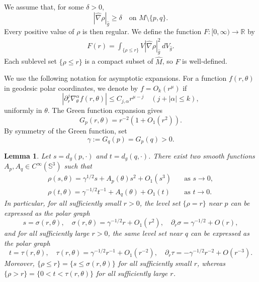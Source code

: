 \documentclass[11pt]{amsart}
\theoremstyle{plain}
\newtheorem{lemma}[theorem]{Lemma}
\numberwithin{equation}{section}
\newcommand{\R}{\mathbb{R}}
\renewcommand{\S}{\mathbb{S}}
\newcommand{\hn}{\widehat{\nabla}}
\newcommand{\hg}{\widehat{g}}
\newcommand{\hm}{\widehat{M}}
\newcommand{\dv}{\,dV_{\widehat{g}}}
\newcommand{\sls}{\{\rho\le r\}}
\newcommand{\ls}{\{\rho=r\}}
\begin{document}
We assume that, for some $\delta>0$, 
\begin{equation}\label{eq:assumption sec1}
|\hn\rho|_{\hg}\ge\delta\quad\text{on $M\setminus\{p,q\}$.}
\end{equation}
Every positive value of $\rho$ is then regular. We define the function $F:[0,\infty)\rightarrow\R$ by
\begin{align}
F(r)=\int_{\sls}V|\hn\rho|_{\hg}^2\dv.
\end{align}
Each sublevel set $\{\rho\le r\}$ is a compact subset of $\hm$, so $F$ is well-defined.

We use the following notation for asymptotic expansions. For a function $f(r,\theta)$ in geodesic polar coordinates, we denote by $f=O_k(r^\mu)$ if
\begin{equation*}
|\partial_r^j\nabla_\theta^\alpha f(r,\theta)|\le C_{j,\alpha} r^{\mu-j}\quad (j+|\alpha|\le k),
\end{equation*}
uniformly in $\theta$. The Green function expansion \cite{LeeParker1987} gives
\begin{equation}\label{eq:asymptotic of G}
G_p(r,\theta)=r^{-2}(1+O_1(r^2)).
\end{equation}
By symmetry of the Green function, set
\begin{equation*}
\gamma:=G_q(p)=G_p(q)>0.
\end{equation*}

\begin{lemma}\label{lem:graphical expression}
Let $s=d_g(p,\cdot)$ and $t=d_g(q,\cdot)$. There exist two smooth functions $A_p, A_q\in C^\infty(\S^3)$ such that 
\begin{align}
\label{eq:rho near p} \rho(s,\theta)=\gamma^{1/2}s+A_p(\theta)s^2+O_1(s^3)&\quad \text{as } s\rightarrow0,\\
\label{eq:rho near q} \rho(t,\theta)=\gamma^{-1/2}t^{-1}+A_q(\theta)+O_1(t)&\quad\text{as } t\rightarrow0.
\end{align}
In particular, for all sufficiently small $r>0$, the level set $\ls$ near $p$ can be expressed as the polar graph
\begin{equation*}
s=\sigma(r,\theta),\quad \sigma(r,\theta)=\gamma^{-1/2}r+O_1(r^2),\quad \partial_r\sigma=\gamma^{-1/2}+O(r),
\end{equation*}
and for all sufficiently large $r>0$, the same level set near $q$ can be expressed as the polar graph
\begin{equation*}
t=\tau(r,\theta),\quad \tau(r,\theta)=\gamma^{-1/2}r^{-1}+O_1(r^{-2}),\quad \partial_r\tau=-\gamma^{-1/2}r^{-2}+O(r^{-3}).
\end{equation*}
Moreover, $\sls=\{s\le\sigma(r,\theta)\}$ for all sufficiently small $r$, whereas $\{\rho>r\}=\{0<t<\tau(r,\theta)\}$ for all sufficiently large $r$.
\end{lemma}
\end{document}
